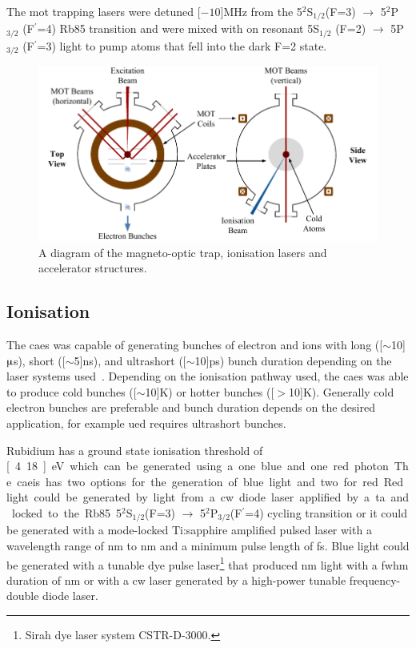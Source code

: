 The \gls{mot} trapping lasers were detuned \unit[$-10$]{MHz} from the 5$^2$S$_{1/2} $(F=3) $\rightarrow$ 5$^2$P$_{3/2}$ (F$^\prime$=4) Rb85 transition and were mixed with on resonant 5S$_{1/2}$ (F=2) $\rightarrow$ 5P$_{3/2}$ (F$^\prime$=3) light to pump atoms that fell into the dark F=2 state.

\begin{figure}
    \center
    \includegraphics[width=145mm]{part2/Figs/MOTdiagram.pdf}
    \caption{A diagram of the magneto-optic trap, ionisation lasers and accelerator structures.}
    \label{figure:mot}
\end{figure}

\subsection{Ionisation}\label{section:two_stage_ionisation}

The \gls{caes} was capable of generating bunches of electron and ions with long (\unit[$\sim$10]{$\muup$s}), short (\unit[$\sim$5]{ns}), and ultrashort (\unit[$\sim$10]{ps}) bunch duration depending on the laser systems used~\cite{speirs_identification_2017,speirs_electron_2017}.
Depending on the ionisation pathway used, the \gls{caes} was able to produce cold bunches (\unit[$\sim$10]{K}) or hotter bunches (\unit[$>$10]{K}).
Generally cold electron bunches are preferable and bunch duration depends on the desired application, for example \gls{ued} requires ultrashort bunches.

Rubidium has a ground state ionisation threshold of \unit[4.18]{eV} which can be generated using a one blue and one red photon.
The \gls{caeis} has two options for the generation of blue light and two for red.
Red light could be generated by light from a \gls{cw} diode laser applified by a \gls{ta} and locked to the Rb85 5$^2$S$_{1/2} $(F=3) $\rightarrow$ 5$^2$P$_{3/2} $(F$^\prime$=4) cycling transition or it could be generated with a mode-locked Ti:sapphire amplified pulsed laser with a wavelength range of \unit[770]{nm} to \unit[830]{nm} and a minimum pulse length of \unit[35]{fs}.
Blue light could be generated with a tunable dye pulse laser\footnote{Sirah dye laser system CSTR-D-3000.} that produced \unit[460 to 490]{nm} light with a \gls{fwhm} duration of \unit[5]{nm} or with a \gls{cw} laser generated by a high-power tunable frequency-double diode laser.

